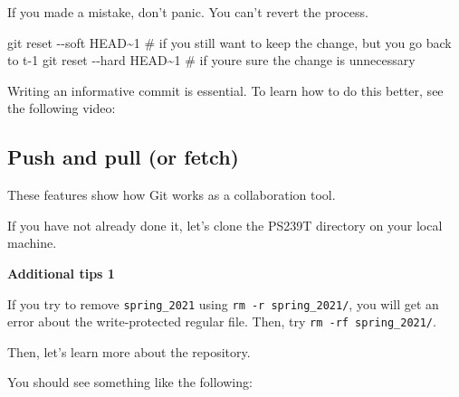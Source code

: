 \documentclass[
  letterpaper,
  DIV=11,
  numbers=noendperiod]{scrreprt}
\newenvironment{Shaded}{\begin{snugshade}}{\end{snugshade}}
\newcommand{\AttributeTok}[1]{\textcolor[rgb]{0.40,0.45,0.13}{#1}}
\newcommand{\CommentTok}[1]{\textcolor[rgb]{0.37,0.37,0.37}{#1}}
\newcommand{\ExtensionTok}[1]{\textcolor[rgb]{0.00,0.23,0.31}{#1}}
\newcommand{\FunctionTok}[1]{\textcolor[rgb]{0.28,0.35,0.67}{#1}}
\newcommand{\NormalTok}[1]{\textcolor[rgb]{0.00,0.23,0.31}{#1}}
\begin{document}
If you made a mistake, don't panic. You can't revert the process.

\begin{Shaded}
\begin{Highlighting}[]
\FunctionTok{git}\NormalTok{ reset }\AttributeTok{{-}{-}soft}\NormalTok{ HEAD\textasciitilde{}1 }\CommentTok{\# if you still want to keep the change, but you go back to t{-}1 }
\FunctionTok{git}\NormalTok{ reset }\AttributeTok{{-}{-}hard}\NormalTok{ HEAD\textasciitilde{}1 }\CommentTok{\# if you\textquotesingle{}re sure the change is unnecessary }
\end{Highlighting}
\end{Shaded}

Writing an informative commit is essential. To learn how to do this
better, see the following video:

\hypertarget{push-and-pull-or-fetch}{%
\subsection*{Push and pull (or fetch)}\label{push-and-pull-or-fetch}}

These features show how Git works as a collaboration tool.

If you have not already done it, let's clone the PS239T directory on
your local machine.

\begin{Shaded}
\end{Shaded}

\textbf{Additional tips 1}

If you try to remove \texttt{spring\_2021} using
\texttt{rm\ -r\ spring\_2021/}, you will get an error about the
write-protected regular file. Then, try \texttt{rm\ -rf\ spring\_2021/}.

Then, let's learn more about the repository.

\begin{Shaded}
\end{Shaded}

You should see something like the following:
\end{document}
